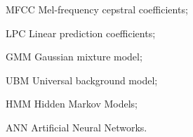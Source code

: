 \Abbreviations %
\begin{abbreviation}
\item[MFCC] Mel-frequency cepstral coefficients;
\item[LPC] Linear prediction coefficients;
\item[GMM] Gaussian mixture model;
\item[UBM] Universal background model;
\item[HMM] Hidden Markov Models;
\item[ANN] Artificial Neural Networks.
\end{abbreviation}

